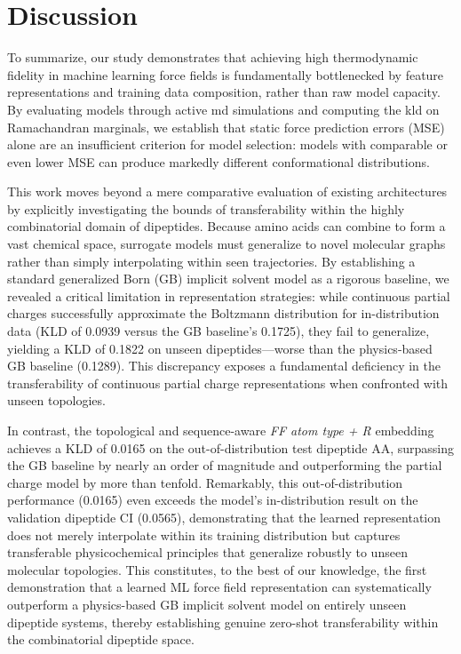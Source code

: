 \section{Discussion}

To summarize, our study demonstrates that achieving high thermodynamic fidelity in machine learning force fields is fundamentally bottlenecked by feature representations and training data composition, rather than raw model capacity. By evaluating models through active \gls{md} simulations and computing the \gls{kld} on Ramachandran marginals, we establish that static force prediction errors (MSE) alone are an insufficient criterion for model selection: models with comparable or even lower MSE can produce markedly different conformational distributions.

This work moves beyond a mere comparative evaluation of existing architectures by explicitly investigating the bounds of transferability within the highly combinatorial domain of dipeptides. Because amino acids can combine to form a vast chemical space, surrogate models must generalize to novel molecular graphs rather than simply interpolating within seen trajectories. By establishing a standard generalized Born (GB) implicit solvent model as a rigorous baseline, we revealed a critical limitation in representation strategies: while continuous partial charges \citep{machine_learning_implicit_solvation} successfully approximate the Boltzmann distribution for in-distribution data (KLD of 0.0939 versus the GB baseline's 0.1725), they fail to generalize, yielding a KLD of 0.1822 on unseen dipeptides---worse than the physics-based GB baseline (0.1289). This discrepancy exposes a fundamental deficiency in the transferability of continuous partial charge representations when confronted with unseen topologies.

In contrast, the topological and sequence-aware \textit{FF atom type + R} embedding \citep{klein_transferable_2024} achieves a KLD of 0.0165 on the out-of-distribution test dipeptide AA, surpassing the GB baseline by nearly an order of magnitude and outperforming the partial charge model by more than tenfold. Remarkably, this out-of-distribution performance (0.0165) even exceeds the model's in-distribution result on the validation dipeptide CI (0.0565), demonstrating that the learned representation does not merely interpolate within its training distribution but captures transferable physicochemical principles that generalize robustly to unseen molecular topologies. This constitutes, to the best of our knowledge, the first demonstration that a learned ML force field representation can systematically outperform a physics-based GB implicit solvent model on entirely unseen dipeptide systems, thereby establishing genuine zero-shot transferability within the combinatorial dipeptide space.

